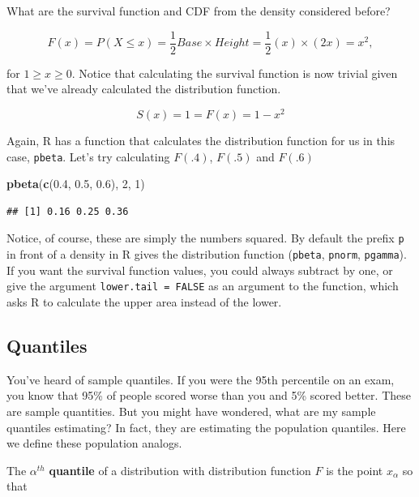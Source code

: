 \documentclass[]{article}
\newenvironment{Shaded}{\begin{snugshade}}{\end{snugshade}}
\newcommand{\KeywordTok}[1]{\textcolor[rgb]{0.13,0.29,0.53}{\textbf{{#1}}}}
\newcommand{\DecValTok}[1]{\textcolor[rgb]{0.00,0.00,0.81}{{#1}}}
\newcommand{\FloatTok}[1]{\textcolor[rgb]{0.00,0.00,0.81}{{#1}}}
\newcommand{\NormalTok}[1]{{#1}}
\begin{document}
What are the survival function and CDF from the density considered
before?

\[
F(x) = P(X \leq x) = \frac{1}{2} Base \times Height = \frac{1}{2} (x) \times (2 x) = x^2,
\]

for $1 \geq x \geq 0$. Notice that calculating the survival function is
now trivial given that we've already calculated the distribution
function.

\[
 S(x) = 1 = F(x) = 1 - x^2
\]

Again, R has a function that calculates the distribution function for us
in this case, \texttt{pbeta}. Let's try calculating $F(.4)$, $F(.5)$ and
$F(.6)$

\begin{Shaded}
\begin{Highlighting}[]
\KeywordTok{pbeta}\NormalTok{(}\KeywordTok{c}\NormalTok{(}\FloatTok{0.4}\NormalTok{, }\FloatTok{0.5}\NormalTok{, }\FloatTok{0.6}\NormalTok{), }\DecValTok{2}\NormalTok{, }\DecValTok{1}\NormalTok{)}
\end{Highlighting}
\end{Shaded}

\begin{verbatim}
## [1] 0.16 0.25 0.36
\end{verbatim}

Notice, of course, these are simply the numbers squared. By default the
prefix \texttt{p} in front of a density in R gives the distribution
function (\texttt{pbeta}, \texttt{pnorm}, \texttt{pgamma}). If you want
the survival function values, you could always subtract by one, or give
the argument \texttt{lower.tail = FALSE} as an argument to the function,
which asks R to calculate the upper area instead of the lower.

\subsection{Quantiles}\label{quantiles}

You've heard of sample quantiles. If you were the 95th percentile on an
exam, you know that 95\% of people scored worse than you and 5\% scored
better. These are sample quantities. But you might have wondered, what
are my sample quantiles estimating? In fact, they are estimating the
population quantiles. Here we define these population analogs.

The $\alpha^{th}$ \textbf{quantile} of a distribution with distribution
function $F$ is the point $x_\alpha$ so that
\end{document}
